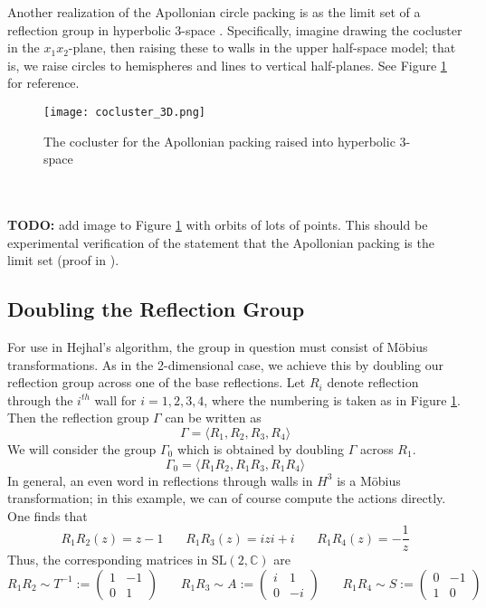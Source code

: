\documentclass[]{article}
\begin{document}
Another realization of the Apollonian circle packing is as the limit set of a reflection group in hyperbolic 3-space \cite{kontorovich2017geometry}.
Specifically, imagine drawing the cocluster in the $x_1x_2$-plane, then raising these to walls in the upper half-space model; that is, we raise circles to hemispheres and lines to vertical half-planes.
See Figure \ref{coc3d} for reference.
\begin{figure}[h]
	\centering
	\texttt{[image: cocluster\_3D.png]}
	\caption{The cocluster for the Apollonian packing raised into hyperbolic 3-space}
	\label{coc3d}
\end{figure}
\\ \\
\textbf{TODO:} add image to Figure \ref{coc3d} with orbits of lots of points. This should be experimental verification of the statement that the Apollonian packing is the limit set (proof in \cite{kontorovich2017geometry}).

\subsection*{Doubling the Reflection Group}

For use in Hejhal's algorithm, the group in question must consist of M\"obius transformations.
As in the 2-dimensional case, we achieve this by doubling our reflection group across one of the base reflections.
Let $R_i$ denote reflection through the $i^{th}$ wall for $i = 1, 2, 3, 4$, where the numbering is taken as in Figure \ref{coc3d}.
Then the reflection group $\Gamma$ can be written as
$$
\Gamma = \langle R_1, R_2, R_3, R_4 \rangle
$$
We will consider the group $\Gamma_0$ which is obtained by doubling $\Gamma$ across $R_1$.
$$
\Gamma_0 = \langle R_1R_2, R_1R_3, R_1R_4 \rangle
$$
In general, an even word in reflections through walls in $H^3$ is a M\"obius transformation; in this example, we can of course compute the actions directly.
One finds that
$$
R_1R_2(z) = z - 1 ~~~~~~~~ R_1R_3(z) = izi + i ~~~~~~~~ R_1R_4(z) = -\frac{1}{z}
$$
Thus, the corresponding matrices in $\text{SL}(2, \mathbb{C})$ are
$$
R_1R_2 \sim T^{-1} :=
\begin{pmatrix}
	1 & -1 \\
	0 & 1
\end{pmatrix} ~~~~~~~~
R_1R_3 \sim A :=
\begin{pmatrix}
	i & 1 \\
	0 & -i
\end{pmatrix} ~~~~~~~~
R_1R_4 \sim S :=
\begin{pmatrix}
	0 & -1 \\
	1 & 0
\end{pmatrix}
$$
\end{document}
